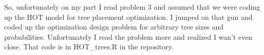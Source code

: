 So, unfortunately on my part I read problem 3 and assumed that we were coding up the HOT model for tree placement optimization. I jumped on that gun and coded up the optimization design problem for arbitrary tree sizes and probabilities. Unfortunately I read the problem more and realized I wan't even close. That code is in HOT\_trees.R in the repository.